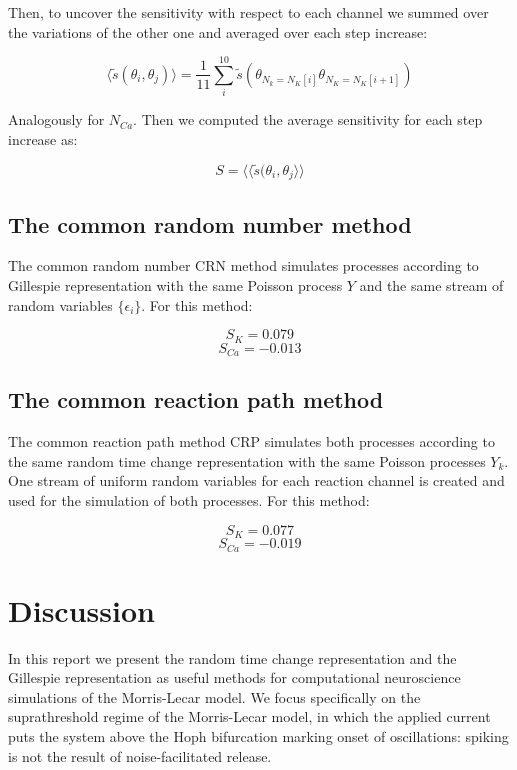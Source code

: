 Then, to uncover the sensitivity with respect to each channel we summed over the variations of the other one and averaged over each step increase:

$$\langle\tilde{s}(\theta_i, \theta_j)\rangle = \frac{1}{11}\sum\limits_{i}^{10}\tilde{s}(\theta_{N_k = N_K[i]}\theta_{N_K= N_K[i+1]})$$

Analogously for $N_{Ca}$.
Then we computed the average sensitivity for each step increase as:

$$S = \langle\langle\tilde{s}(\theta_i,\theta_j\rangle\rangle$$

	\subsection{The common random number method}
	The common random number CRN method simulates processes according to Gillespie representation with the same Poisson process $Y$ and the same stream of random variables $\{\epsilon_i\}$. For this method:

	$$S_{K} = 0.079$$
	$$S_{Ca} = -0.013$$ 
	
 	\subsection{The common reaction path method}
	The common reaction path method CRP simulates both processes according to the same random time change representation with the same Poisson processes $Y_k$.
	One stream of uniform random variables for each reaction channel is created and used for the simulation of both processes. For this method: 

	
	$$S_{K} = 0.077$$
	$$S_{Ca} = -0.019$$ 

\section{Discussion}
\label{section:discussion}

In this report we present the random time change representation and the Gillespie representation as useful methods for computational neuroscience simulations of the Morris-Lecar model. We focus specifically on the suprathreshold regime of the Morris-Lecar model, in which the applied current puts the system above the Hoph bifurcation marking onset of oscillations: spiking is not the result of noise-facilitated release. \\ 

